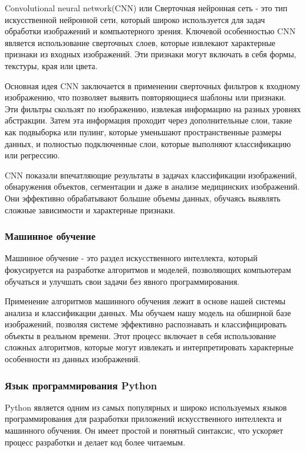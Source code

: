 Convolutional neural network(CNN) или Сверточная нейронная сеть - это тип искусственной нейронной сети, который широко используется для задач обработки изображений и компьютерного зрения. Ключевой особенностью CNN является использование сверточных слоев, которые извлекают характерные признаки из входных изображений. Эти признаки могут включать в себя формы, текстуры, края или цвета.

Основная идея CNN заключается в применении сверточных фильтров к входному изображению, что позволяет выявить повторяющиеся шаблоны или признаки. Эти фильтры скользят по изображению, извлекая информацию на разных уровнях абстракции. Затем эта информация проходит через дополнительные слои, такие как подвыборка или пулинг, которые уменьшают пространственные размеры данных, и полностью подключенные слои, которые выполняют классификацию или регрессию.

CNN показали впечатляющие результаты в задачах классификации изображений, обнаружения объектов, сегментации и даже в анализе медицинских изображений. Они эффективно обрабатывают большие объемы данных, обучаясь выявлять сложные зависимости и характерные признаки.

\subsubsection{Машинное обучение}

Машинное обучение - это раздел искусственного интеллекта, который фокусируется на разработке алгоритмов и моделей, позволяющих компьютерам обучаться и улучшать свои задачи без явного программирования.

Применение алгоритмов машинного обучения лежит в основе нашей системы анализа и классификации данных. Мы обучаем нашу модель на обширной базе изображений, позволяя системе эффективно распознавать и классифицировать объекты в реальном времени. Этот процесс включает в себя использование сложных алгоритмов, которые могут извлекать и интерпретировать характерные особенности из данных изображений.

\subsubsection{Язык программирования Python}

Python является одним из самых популярных и широко используемых языков программирования для разработки приложений искусственного интеллекта и машинного обучения. Он имеет простой и понятный синтаксис, что ускоряет процесс разработки и делает код более читаемым.

